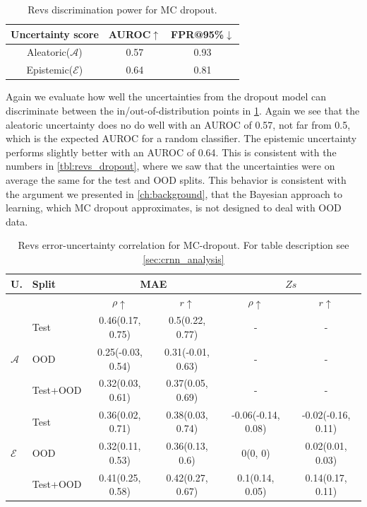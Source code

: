 \begin{table}[htbp]
\centering
    \begin{tabular}{c  c  c}  
        \toprule
        Uncertainty score & AUROC$\uparrow$ & FPR@95\%$\downarrow$\\
        \midrule
        Aleatoric($\mathcal{A}$) & 0.57  & 0.93\\
        Epistemic($\mathcal{E}$) & 0.64 &  0.81 \\
        \midrule
    \end{tabular}
    \caption{Revs discrimination power for MC dropout.}
    \label{tbl:revs_dropout_discrimination}
\end{table}


Again we evaluate how well the uncertainties from the dropout model can discriminate between the in/out-of-distribution points in \cref{tbl:revs_dropout_discrimination}. Again we see that the aleatoric uncertainty does no do well with an AUROC of 0.57, not far from 0.5, which is the expected AUROC for a random classifier. The epistemic uncertainty performs slightly better with an AUROC of 0.64. This is consistent with the numbers in \cref{tbl:revs_dropout}, where we saw that the uncertainties were on average the same for the test and OOD splits. This behavior is consistent with the argument we presented in \cref{ch:background}, that the Bayesian approach to learning, which MC dropout approximates, is not designed to deal with OOD data. 


\begin{table}[htbp]
\centering
    \begin{tabular}{l l c c c c}  
        \toprule
        U. & Split & \multicolumn{2}{c}{MAE} & \multicolumn{2}{c}{$Zs$}\\
        \midrule
        & & $\rho \uparrow$ & $r \uparrow$ & $\rho \uparrow$ & $r \uparrow$ \\
        \multirow{3}{*}{$\mathcal{A}$} 
            & Test     & 0.46(0.17, 0.75) & 0.5(0.22, 0.77) & - & - \\  
            & OOD      & 0.25(-0.03, 0.54) & 0.31(-0.01, 0.63) & - & - \\  
            & Test+OOD & 0.32(0.03, 0.61) & 0.37(0.05, 0.69) & - & - \\ 

        \midrule
        \multirow{3}{*}{$\mathcal{E}$} 
            & Test     & 0.36(0.02, 0.71)  & 0.38(0.03, 0.74) &  -0.06(-0.14, 0.08)  & -0.02(-0.16, 0.11) \\ & OOD      & 0.32(0.11, 0.53) & 0.36(0.13, 0.6) &  0(0, 0) & 0.02(0.01, 0.03) \\
            & Test+OOD & 0.41(0.25, 0.58) & 0.42(0.27, 0.67) &  0.1(0.14, 0.05) & 0.14(0.17, 0.11) \\ 

        \toprule
    \end{tabular}
    \caption[Revs error-uncertainty correlation for MC-dropout]{Revs error-uncertainty correlation for MC-dropout. For table description see \cref{sec:crnn_analysis}}
    \label{tbl:revs_dropout_corr}
\end{table}

